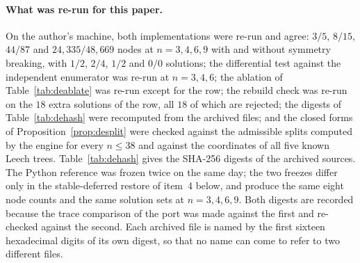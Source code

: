 \paragraph{What was re-run for this paper.}
On the author's machine, both implementations were re-run and agree:
$3/5$, $8/15$, $44/87$ and $24{,}335/48{,}669$ nodes at $n=3,4,6,9$ with and
without symmetry breaking, with $1/2$, $2/4$, $1/2$ and $0/0$ solutions; the
differential test against the independent enumerator was re-run at $n=3,4,6$;
the ablation of Table~\ref{tab:deablate} was re-run except for the
 row; the rebuild check was re-run on the $18$ extra solutions
of the  row, all $18$ of which are rejected; the digests of
Table~\ref{tab:dehash} were recomputed from the archived files; and the
closed forms of Proposition~\ref{prop:desplit} were checked against the
admissible splits computed by the engine for every $n\le38$ and against the
coordinates of all five known Leech trees.
Table~\ref{tab:dehash} gives the SHA-256 digests of the archived sources.  The
Python reference was frozen twice on the same day; the two freezes differ only
in the stable-deferred restore of item~4 below, and produce the same eight node
counts and the same solution sets at $n=3,4,6,9$.  Both digests are recorded
because the trace comparison of the port was made against the first and
re-checked against the second.  Each archived file is named by the first
sixteen hexadecimal digits of its own digest, so that no name can come to refer
to two different files.


